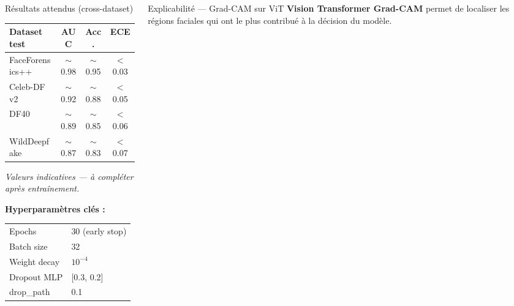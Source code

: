 \documentclass[final]{beamer}
\begin{document}
\begin{frame}[t]
\begin{columns}[t]
\begin{column}{0.31\linewidth}
\begin{block}{Résultats attendus (cross-dataset)}
\centering
\small
\begin{tabular}{@{}lccc@{}}
\toprule
\textbf{Dataset test} & \textbf{AUC} & \textbf{Acc.} & \textbf{ECE}\\
\midrule
FaceForensics++ & $\sim$0.98 & $\sim$0.95 & $<$0.03\\
Celeb-DF v2     & $\sim$0.92 & $\sim$0.88 & $<$0.05\\
DF40            & $\sim$0.89 & $\sim$0.85 & $<$0.06\\
WildDeepfake    & $\sim$0.87 & $\sim$0.83 & $<$0.07\\
\bottomrule
\end{tabular}
\vspace{6pt}

\textit{Valeurs indicatives — à compléter après entraînement.}
\vspace{6pt}

\textbf{Hyperparamètres clés :}\\[4pt]
\begin{tabular}{@{}ll@{}}
Epochs & 30 (early stop)\\
Batch size & 32\\
Weight decay & $10^{-4}$\\
Dropout MLP & [0.3, 0.2]\\
drop\_path & 0.1\\
\end{tabular}
\end{block}
\end{column}

\begin{column}{0.36\linewidth}
\begin{block}{Explicabilité — Grad-CAM sur ViT}
\textbf{Vision Transformer Grad-CAM} permet de localiser les régions faciales
qui ont le plus contribué à la décision du modèle.

\vspace{8pt}
\begin{center}
\end{center}
\end{block}
\end{column}
\end{columns}
\end{frame}
\end{document}
